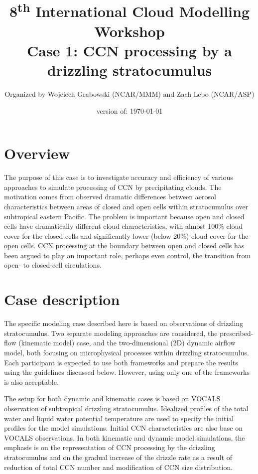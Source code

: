 \documentclass{article}
\title{
  8\textsuperscript{th} International Cloud Modelling Workshop\\
  Case 1: CCN processing by a drizzling stratocumulus
}
\author{
  Organized by Wojciech Grabowski (NCAR/MMM) and Zach Lebo (NCAR/ASP)
}
\date{
  version of: \today
}
\begin{document}
  \maketitle

  \section{Overview}

  The purpose of this case is to investigate accuracy and efficiency of various 
    approaches to simulate processing of CCN by precipitating clouds. 
  The motivation comes from observed dramatic differences between aerosol 
    characteristics between areas of closed and open cells within stratocumulus 
    over subtropical eastern Pacific. 
  The problem is important because open and closed cells have dramatically 
    different cloud characteristics, with almost 100\% cloud cover for the closed 
    cells and significantly lower (below 20\%) cloud cover for the open cells. 
  CCN processing at the boundary between open and closed cells has been argued to 
    play an important role, perhaps even control, the transition from open- 
    to closed-cell circulations.

  \section{Case description}

  The specific modeling case described here is based on observations 
    of drizzling stratocumulus. 
  Two separate modeling approaches are considered, the prescribed-flow 
    (kinematic model) case, and the two-dimensional (2D) dynamic airflow model, 
    both focusing on microphysical processes within drizzling stratocumulus. 
  Each participant is expected to use both frameworks and prepare the results 
    using the guidelines discussed below. 
  However, using only one of the frameworks is also acceptable.

  The setup for both dynamic and kinematic cases is based on VOCALS observation 
    of subtropical drizzling stratocumulus. 
  Idealized profiles of the total water and liquid water potential temperature 
    are used to specify the initial profiles for the model simulations. 
  Initial CCN characteristics are also base on VOCALS observations. 
  In both kinematic and dynamic model simulations, the emphasis is on the 
    representation of CCN processing by the drizzling stratocumulus and on the 
    gradual increase of the drizzle rate as a result of reduction of total 
    CCN number and modification of CCN size distribution.
\end{document}
